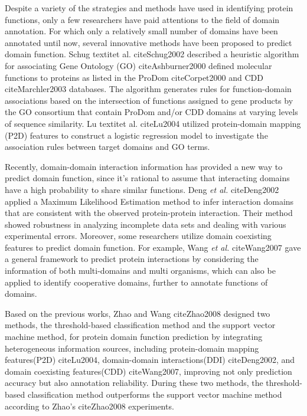 \documentclass{bmcart}
\begin{document}
Despite a variety of the strategies and methods have used in identifying protein functions, only a few researchers have paid attentions to the field of domain annotation. For which only a relatively small number of domains have been annotated until now, several innovative methods have been proposed to predict domain function. Schug  textit{et al.} cite{Schug2002} described a heuristic algorithm for associating Gene Ontology (GO) cite{Ashburner2000} defined molecular functions to proteins as listed in the ProDom cite{Corpet2000} and CDD cite{Marchler2003} databases. The algorithm generates rules for function-domain associations based on the intersection of functions assigned to gene products by the GO consortium that contain ProDom and/or CDD domains at varying levels of sequence similarity. Lu textit{et al.} cite{Lu2004} utilized protein-domain mapping (P2D) features to construct a logistic regression model to investigate the association rules between target domains and GO terms.

Recently, domain-domain interaction information has provided a new way to predict domain function, since it's rational to assume that interacting domains have a high probability to share similar functions. Deng \textit{et al.} cite{Deng2002} applied a Maximum Likelihood Estimation method to infer interaction domains that are consistent with the observed protein-protein interaction. Their method showed robustness in analyzing incomplete data sets and dealing with various experimental errors. Moreover, some researchers utilize domain coexisting features to predict domain function. For example, Wang \textit{et al.} cite{Wang2007} gave a general framework to predict protein interactions by considering the information of both multi-domains and multi organisms, which can also be applied to identify cooperative domains, further to annotate functions of domains.

Based on the previous works, Zhao and Wang cite{Zhao2008} designed two methods, the threshold-based classification method and the support vector machine method, for protein domain function prediction by integrating heterogeneous information sources, including protein-domain mapping features(P2D) cite{Lu2004}, domain-domain interactions(DDI) cite{Deng2002}, and domain coexisting features(CDD) cite{Wang2007}, improving not only prediction accuracy but also annotation reliability. During these two methods, the threshold-based classification method outperforms the support vector machine method according to Zhao's cite{Zhao2008} experiments.
\end{document}
